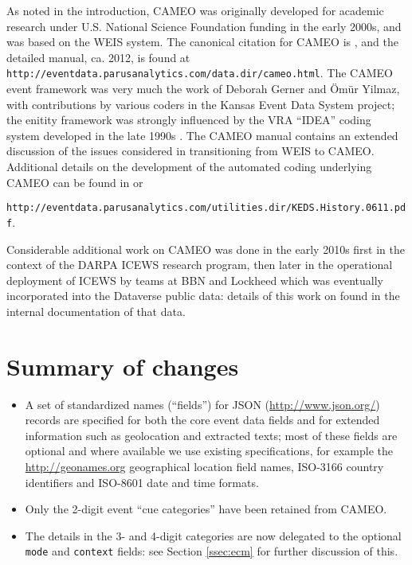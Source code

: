 \documentclass[11pt]{report}
\begin{document}
As noted in the introduction, CAMEO was originally developed for academic research under U.S. National Science Foundation funding in the early 2000s, and was based on the WEIS system. The canonical citation for CAMEO is \cite{SGY09}, and the detailed manual, ca. 2012, is found at \texttt{\footnotesize http://eventdata.parusanalytics.com/data.dir/cameo.html}.  The CAMEO event framework was very much the work of Deborah Gerner and \"Om\"ur Yilmaz, with contributions by various coders in the Kansas Event Data System project; the enitity framework was strongly influenced by the VRA ``IDEA'' coding system developed in the late 1990s \citep{BBOJT03}. The CAMEO manual contains an extended discussion of the issues considered in transitioning from WEIS to CAMEO. Additional details on the development of the automated coding underlying CAMEO can be found in \cite{Schrodt06TPM} or {\texttt{\footnotesize http://eventdata.parusanalytics.com/utilities.dir/KEDS.History.0611.pdf}.

Considerable additional work on CAMEO was done in the early 2010s first in the context of the DARPA ICEWS research program, then later in the operational deployment of ICEWS by teams at BBN and Lockheed which was eventually incorporated into the Dataverse public data: details of this work on found in the internal documentation of that data.

\section{Summary of changes}

\begin{itemize}

\item A set of standardized names (``fields'') for JSON (\url{http://www.json.org/}) records are specified for both the core event data fields and for extended information such as geolocation and extracted texts; most of these fields are optional and where available we use existing specifications, for example the \url{http://geonames.org} geographical location field names, ISO-3166 country identifiers and ISO-8601 date and time formats.

\item Only the 2-digit event ``cue categories'' have been retained from CAMEO.

\item The details in the 3- and 4-digit categories are now delegated to the optional \texttt{mode} and \texttt{context} fields: see Section \ref{ssec:ecm} for further discussion of this.


\end{itemize}}
\end{document}
